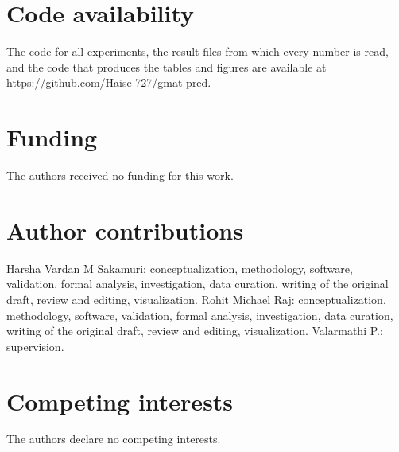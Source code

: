 \section*{Code availability}

The code for all experiments, the result files from which every number is read, and the code that produces the tables and figures are available at https://github.com/Haise-727/gmat-pred.

\section*{Funding}

The authors received no funding for this work.

\section*{Author contributions}

Harsha Vardan M Sakamuri: conceptualization, methodology, software, validation, formal analysis, investigation, data curation, writing of the original draft, review and editing, visualization. Rohit Michael Raj: conceptualization, methodology, software, validation, formal analysis, investigation, data curation, writing of the original draft, review and editing, visualization. Valarmathi P.: supervision.

\section*{Competing interests}

The authors declare no competing interests.
